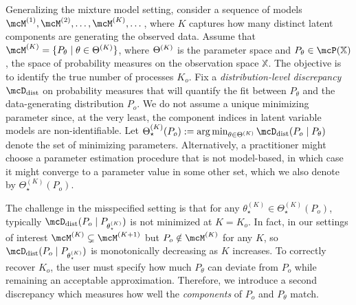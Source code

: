 Generalizing the mixture model setting, consider a sequence of models $\model{1}, \model{2}, \dots, \model{K}, \dots$, where $K$ captures how many distinct latent components are generating the observed data.
Assume that $\model{K} = \{ P_{\theta} \mid \theta \in \paramSpace{K} \}$, where $\Theta^{(K)}$ is the parameter space
and $P_{\theta} \in \mcP(\mathbb{X})$, the space of probability measures on the observation space $\mathbb{X}$. 
The objective is to identify the true number of processes $K_o$.
Fix a \emph{distribution-level discrepancy} $\distDisc$ on probability measures that will quantify the fit between $P_{\theta}$ and the data-generating distribution $P_{o}$.
We do not assume a unique minimizing parameter since, at the very least, 
the component indices in latent variable models are non-identifiable. 
Let $\Theta_{\star}^{(K)}(P_{o}) \defas \argmin_{\theta \in\paramSpace{K}} \distDisc(P_{o} \mid P_{\theta})$ 
denote the set of minimizing parameters.
Alternatively, a practitioner might choose a parameter estimation procedure that is not model-based, in which case it might converge to a parameter value in some other set, which we also denote by $\Theta_{\star}^{(K)}(P_{o})$.

The challenge in the misspecified setting is that for any $\theta_{\star}^{(K)} \in \Theta_{\star}^{(K)}(P_{o})$, typically $\distDisc(P_{o} \mid P_{\theta_{\star}^{(K)}})$ is not minimized at $K = K_{o}$.
In fact, in our settings of interest $\model{K} \subsetneq \model{K+1}$ but $P_{o} \notin \model{K}$ for any $K$, so
$\distDisc(P_{o} \mid P_{\theta_{\star}^{(K)}})$ is monotonically decreasing as $K$ increases. 
To correctly recover $K_{o}$, the user must specify how much $P_{\theta}$ can deviate from $P_{o}$ while remaining an acceptable approximation.
Therefore, we introduce a second discrepancy which measures how well the \emph{components} of $P_{o}$ and $P_{\theta}$ match.

